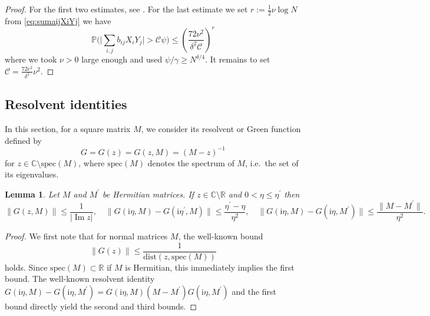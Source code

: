 \documentclass[10pt,a4paper]{amsart}
\DeclareMathOperator{\Ima}{Im}
\newcommand{\ii}{\mathrm{i}}
\newcommand{\abs}[1]{\left| #1 \right|}
\newcommand{\absbb}[1]{\biggl| #1 \biggr|}
\newcommand{\R}{\mathbb{R}}
\newcommand{\C}{\mathbb{C}}
\renewcommand{\Im}{\Ima}
\newtheorem{lemma}{Lemma}[section]
\numberwithin{equation}{section}
\begin{document}
	\begin{proof}
		For the first two estimates, see \cite[Corollary A.21]{alt2021delocalization}. For the last estimate we set $r:=\frac{1}{2} \nu \log N$ from \eqref{eq:sumaijXiYj} we have
		\begin{equation*}
			\mathbb{P} \biggl( \absbb{ \sum_{i,j} b_{ij}X_i Y_j} > \mathcal{C} \psi \biggr) \le \left(\frac{ 72 \nu^2}{\delta^2 \mathcal{C}} \right)^r
		\end{equation*}
		where we took $\nu>0$ large enough and used $\psi/ \gamma \ge N^{\delta /4}$. It remains to set $\mathcal{C} = \frac{72 e^2}{\delta^2} \nu^2$.
	\end{proof}
	
   	\subsection{Resolvent identities} \label{sec:resolvent_identities} 
   	
	In this section, for a square matrix $M$, we consider its resolvent or Green function defined by 
	\begin{equation}
		G = G(z) = G(z,M) =  (M - z)^{-1} 
	\end{equation}
	for $z \in\C \setminus \mathrm{spec}(M)$, where $\mathrm{spec}(M)$ denotes the spectrum of $M$, i.e.\ the set of its eigenvalues. 
	\begin{lemma}\label{lem:disttospect}
		Let $M$ and $M^\prime$ be Hermitian matrices. If $z \in \C\setminus \R$ and $0 < \eta \le \eta^{\prime}$ then 
		\begin{equation*}
			\|G(z, M)\| \le \frac{1}{\abs{\Im z}}, \quad 
			\|G(\ii \eta,  M) - G(\ii \eta^\prime, M)\| \le \frac{\eta^{\prime} - \eta}{\eta^2}, \quad  
			\|G(\ii \eta,  M) - G(\ii \eta, M^\prime)\| \le \frac{\|M - M^{\prime}\|}{\eta^2}.
		\end{equation*}
	\end{lemma}
	\begin{proof} 
		We first note that for normal matrices $M$, the well-known bound 
		\begin{equation*}
			\|G(z)\| \le \frac{1}{\mathrm{dist}(z, \mathrm{spec}(M))} 
		\end{equation*}
		holds. Since $\mathrm{spec}(M) \subset \R$ if $M$ is Hermitian, this immediately implies the first bound. The well-known resolvent identity $G(\ii \eta,  M) - G(\ii \eta, M^\prime) = G(\ii \eta,  M) (M-M^{\prime}) G(\ii \eta, M^\prime)$ and the first bound directly yield the second and third bounds. 
	\end{proof} 
	
\end{document}

